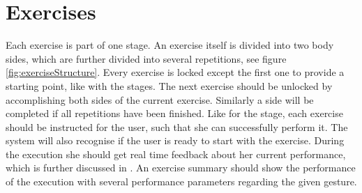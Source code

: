 \section{Exercises}\label{4_4_exercises}
Each exercise is part of one stage. An exercise itself is divided into two body sides, which are further divided into several repetitions, see figure \ref{fig:exerciseStructure}. Every exercise is locked except the first one to provide a starting point, like with the stages. The next exercise should be unlocked by accomplishing both sides of the current exercise. Similarly a side will be completed if all repetitions have been finished. Like for the stage, each exercise should be instructed for the user, such that she can successfully perform it. The system will also recognise if the user is ready to start with the exercise. During the execution she should get real time feedback about her current performance, which is further discussed in \textbf{}. An exercise summary should show the performance of the execution with several performance parameters regarding the given gesture.

